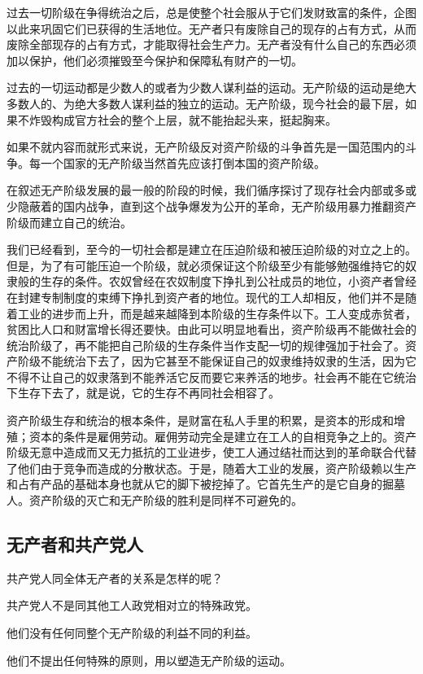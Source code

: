     过去一切阶级在争得统治之后，总是使整个社会服从于它们发财致富的条件，企图以此来巩固它们已获得的生活地位。无产者只有废除自己的现存的占有方式，从而废除全部现存的占有方式，才能取得社会生产力。无产者没有什么自己的东西必须加以保护，他们必须摧毁至今保护和保障私有财产的一切。

    过去的一切运动都是少数人的或者为少数人谋利益的运动。无产阶级的运动是绝大多数人的、为绝大多数人谋利益的独立的运动。无产阶级，现今社会的最下层，如果不炸毁构成官方社会的整个上层，就不能抬起头来，挺起胸来。

    如果不就内容而就形式来说，无产阶级反对资产阶级的斗争首先是一国范围内的斗争。每一个国家的无产阶级当然首先应该打倒本国的资产阶级。

    在叙述无产阶级发展的最一般的阶段的时候，我们循序探讨了现存社会内部或多或少隐蔽着的国内战争，直到这个战争爆发为公开的革命，无产阶级用暴力推翻资产阶级而建立自己的统治。

    我们已经看到，至今的一切社会都是建立在压迫阶级和被压迫阶级的对立之上的。但是，为了有可能压迫一个阶级，就必须保证这个阶级至少有能够勉强维持它的奴隶般的生存的条件。农奴曾经在农奴制度下挣扎到公社成员的地位，小资产者曾经在封建专制制度的束缚下挣扎到资产者的地位。现代的工人却相反，他们并不是随着工业的进步而上升，而是越来越降到本阶级的生存条件以下。工人变成赤贫者，贫困比人口和财富增长得还要快。由此可以明显地看出，资产阶级再不能做社会的统治阶级了，再不能把自己阶级的生存条件当作支配一切的规律强加于社会了。资产阶级不能统治下去了，因为它甚至不能保证自己的奴隶维持奴隶的生活，因为它不得不让自己的奴隶落到不能养活它反而要它来养活的地步。社会再不能在它统治下生存下去了，就是说，它的生存不再同社会相容了。

    资产阶级生存和统治的根本条件，是财富在私人手里的积累，是资本的形成和增殖；资本的条件是雇佣劳动。雇佣劳动完全是建立在工人的自相竞争之上的。资产阶级无意中造成而又无力抵抗的工业进步，使工人通过结社而达到的革命联合代替了他们由于竞争而造成的分散状态。于是，随着大工业的发展，资产阶级赖以生产和占有产品的基础本身也就从它的脚下被挖掉了。它首先生产的是它自身的掘墓人。资产阶级的灭亡和无产阶级的胜利是同样不可避免的。
    \subsection{无产者和共产党人}
    共产党人同全体无产者的关系是怎样的呢？

    共产党人不是同其他工人政党相对立的特殊政党。

    他们没有任何同整个无产阶级的利益不同的利益。

    他们不提出任何特殊的原则，用以塑造无产阶级的运动。

